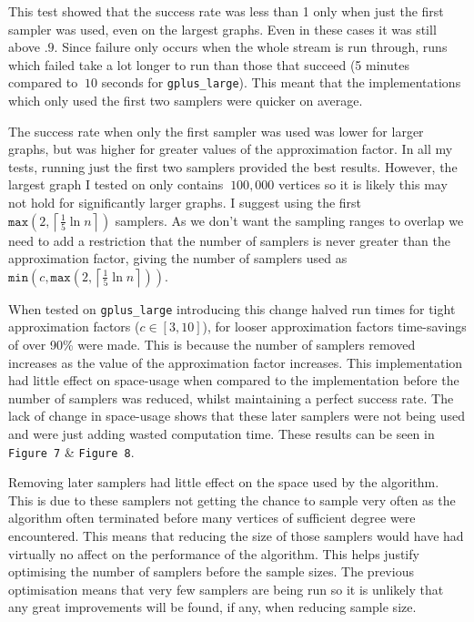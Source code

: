 \documentclass[11pt,twoside,a4paper]{report}
\begin{document}
\par This test showed that the success rate was less than 1 only when just the first sampler was used, even on the largest graphs. Even in these cases it was still above $.9$. Since failure only occurs when the whole stream is run through, runs which failed take a lot longer to run than those that succeed (5 minutes compared to $~10$ seconds for \texttt{gplus\_large}). This meant that the implementations which only used the first two samplers were quicker on average.

\par The success rate when only the first sampler was used was lower for larger graphs, but was higher for greater values of the approximation factor. In all my tests, running just the first two samplers provided the best results. However, the largest graph I tested on only contains $~100,000$ vertices so it is likely this may not hold for significantly larger graphs. I suggest using the first $\mathtt{max}\left(2,\left\lceil\frac15\ln n\right\rceil\right)$ samplers. As we don't want the sampling ranges to overlap we need to add a restriction that the number of samplers is never greater than the approximation factor, giving the number of samplers used as $\mathtt{min}\left(c,\mathtt{max}\left(2,\left\lceil\frac15\ln n\right\rceil\right)\right)$.

\par When tested on \texttt{gplus\_large} introducing this change halved run times for tight approximation factors ($c\in[3,10]$), for looser approximation factors time-savings of over 90\% were made. This is because the number of samplers removed increases as the value of the approximation factor increases. This implementation had little effect on space-usage when compared to the implementation before the number of samplers was reduced, whilst maintaining a perfect success rate. The lack of change in space-usage shows that these later samplers were not being used and were just adding wasted computation time. These results can be seen in \texttt{Figure 7} \& \texttt{Figure 8}.
\horizontalline
\par Removing later samplers had little effect on the space used by the algorithm. This is due to these samplers not getting the chance to sample very often as the algorithm often terminated before many vertices of sufficient degree were encountered. This means that reducing the size of those samplers would have had virtually no affect on the performance of the algorithm. This helps justify optimising the number of samplers before the sample sizes. The previous optimisation means that very few samplers are being run so it is unlikely that any great improvements will be found, if any, when reducing sample size.
\end{document}
